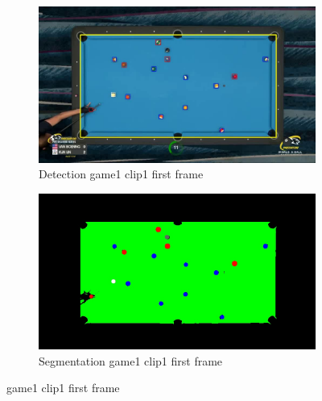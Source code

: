 \begin{figure}[H]
    \centering
    \begin{subfigure}[b]{0.35\textwidth}
        \centering
        \includegraphics[width=\textwidth]{images/Detection/game1_clip1_detected_balls_first_frame.jpg}
        \caption{Detection game1 clip1 first frame}
        \label{fig: game1_clip1_first_frame_detected}
    \end{subfigure}
    \begin{subfigure}[b]{0.35\textwidth}
        \centering
        \includegraphics[width=\textwidth]{images/Segmentation/game1_clip1_segmented_balls_first_frame.jpg}
        \caption{Segmentation game1 clip1 first frame}
		\label{fig: game1_clip1_first_frame_segmented}
    \end{subfigure}
	\caption{game1 clip1 first frame}
\end{figure}


